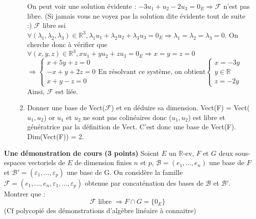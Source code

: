 \documentclass{article}
\begin{document}
\begin{enumerate}
\begin{enumerate}
        On peut voir une solution évidente : $-3u_{1}+u_{2}-2u_{3}=0_{E} \Longrightarrow \mathcal{F}$ n'est pas libre.\newline
        (Si jamais vous ne voyez pas la solution dite évidente tout de suite :)\newline
        $\mathcal{F}$ libre ssi $\forall(\lambda_{1},\lambda_{2},\lambda_{3})\in\mathbb{R}^{3}, \lambda_{1}u_{1}+\lambda_{2}u_{2}+\lambda_{3}u_{3}=0_{E}\Longrightarrow \lambda_{1}=\lambda_{2}=\lambda_{3}=0$. On cherche donc à vérifier que $\forall(x,y,z)\in\mathbb{R}^{3},xu_{1}+yu_{2}+zu_{3}=0_{E} \Longrightarrow x=y=z=0$\newline
        $\Longrightarrow\left\{
            \begin{array}{l}
                x+5y+z=0 \\
                -x+y+2z=0 \\
                x+y-z=0
            \end{array} \text{En résolvant ce système, on obtient}
        \left\{
            \begin{array}{l}
                x = -3y \\
                y\in\mathbb{R} \\
                z = -2y
            \end{array}$\newline
        Ainsi, $\mathcal{F}$ est liée.
        \item Donner une base de Vect($\mathcal{F}$) et en déduire sa dimension.\newline
        Vect(F) = Vect($u_{1},u_{2}$) or $u_{1}$ et $u_{2}$ ne sont pas colinéaires donc ($u_{1},u_{2}$) est libre et génératrice par la définition de Vect. C'est donc une base de Vect(F).\newline
        Dim(Vect(F)) = 2.
    \end{enumerate}
\end{enumerate}
\newline\newline\newline

\noindent\textbf{Une démonstration de cours (3 points)}\newline
Soient $E$ un $\mathbb{R}$-ev, $F$ et $G$ deux sous-espaces vectoriels de $E$ de dimension finies $n$ et $p$, $\mathcal{B} = (e_{1},...,e_{n})$ une base de $F$ et $\mathcal{B'} = (\varepsilon_{1},...,\varepsilon_{p})$ une base de G.\newline
On considère la famille $\mathcal{F} = (e_{1},...,e_{n},\varepsilon_{1},...,\varepsilon_{p})$ obtenue par concaténation des bases de $\mathcal{B}$ et $\mathcal{B'}$. Montrer que :
\[ \mathcal{F} \text{ libre } \Longrightarrow F\cap G = \{0_{E}\} \]
(Cf polycopié des démonstrations d'algèbre linéaire à connaitre)
\end{document}
